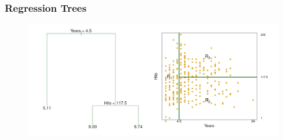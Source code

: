 \documentclass[
  shownotes,
  xcolor={svgnames},
  hyperref={colorlinks,citecolor=DarkBlue,linkcolor=DarkRed,urlcolor=DarkBlue}
  ]{beamer}
\begin{document}
\begin{frame}[fragile]
\frametitle{Regression Trees}


\begin{figure}[H] \centering
            \captionsetup{justification=centering}
              \includegraphics[scale=0.4]{figures/hitters.png}                           
 \end{figure}
\end{frame}

\end{document}

